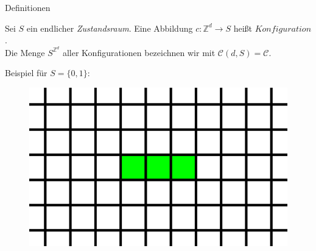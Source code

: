 \documentclass[aspectratio=169]{beamer}
\begin{document}
  \begin{frame}{Definitionen}
    \begin{definition*}
      Sei $S$ ein endlicher \textit{Zustandsraum}. Eine Abbildung $c: \mathbb{Z}^d \to S$  heißt $Konfiguration$. \\
      Die Menge $S^{\mathbb{Z}^d}$ aller Konfigurationen bezeichnen wir mit $\mathcal{C}(d, S) = \mathcal{C}$.
    \end{definition*}

    \pause

    Beispiel für $S = \{0, 1\}$:
    \begin{figure}[H]
        \centering
        \includegraphics[width = 0.35 \textheight]{configuration.png}
    \end{figure}

  \end{frame}
\end{document}
